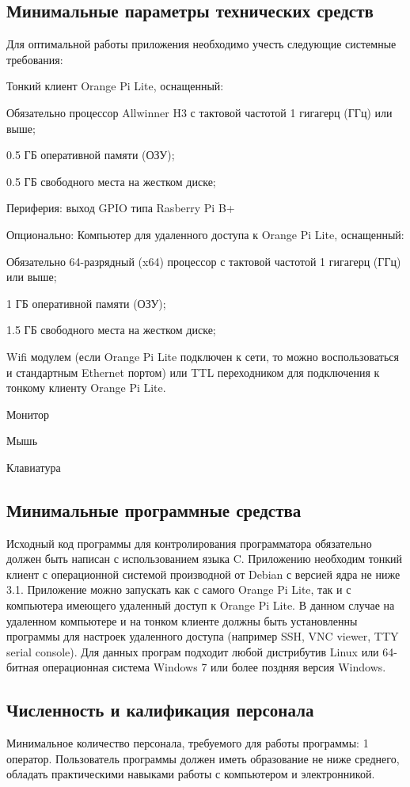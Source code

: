 \subsection{Минимальные параметры технических средств}
Для оптимальной работы приложения необходимо учесть следующие системные требования:
\begin{my_enumerate}
\item Тонкий клиент Orange Pi Lite, оснащенный:
    \begin{my_enumerate}
    \item Обязательно процессор Allwinner H3 с тактовой частотой 1 гигагерц (ГГц) или выше;
    \item 0.5 ГБ оперативной памяти (ОЗУ);
    \item 0.5 ГБ свободного места на жестком диске;
    \item Периферия: выход GPIO типа Rasberry Pi B+
    \end{my_enumerate}
\item Опционально: Компьютер для удаленного доступа к Orange Pi Lite, оснащенный:
    \begin{my_enumerate}
    \item Обязательно 64-разрядный (x64) процессор с тактовой частотой 1 гигагерц (ГГц) или выше;
    \item 1 ГБ оперативной памяти (ОЗУ);
    \item 1.5 ГБ свободного места на жестком диске;
    \item Wifi модулем (если Orange Pi Lite подключен к сети, то можно воспользоваться и стандартным Ethernet портом) или TTL переходником для подключения к тонкому клиенту Orange Pi Lite.
    \end{my_enumerate}
\item Монитор
\item Мышь
\item Клавиатура
\end{my_enumerate}


\subsection{Минимальные программные средства}
Исходный код программы для контролирования программатора обязательно должен быть написан с использованием языка C. Приложению необходим тонкий клиент с операционной системой производной от Debian с версией ядра не ниже 3.1. Приложение можно запускать как с  самого Orange Pi Lite, так и с компьютера имеющего удаленный доступ к Orange Pi Lite. В данном случае на удаленном компьютере и на тонком клиенте должны быть установленны программы для настроек удаленного доступа (например SSH, VNC viewer, TTY serial console). Для данных програм подходит любой дистрибутив Linux или 64-битная операционная система Windows 7 или более поздняя версия Windows.


\subsection{Численность и калификация персонала}
Минимальное количество персонала, требуемого для работы программы: 1 оператор. Пользователь программы должен иметь образование не ниже среднего, обладать практическими навыками работы с компьютером и электронникой.
